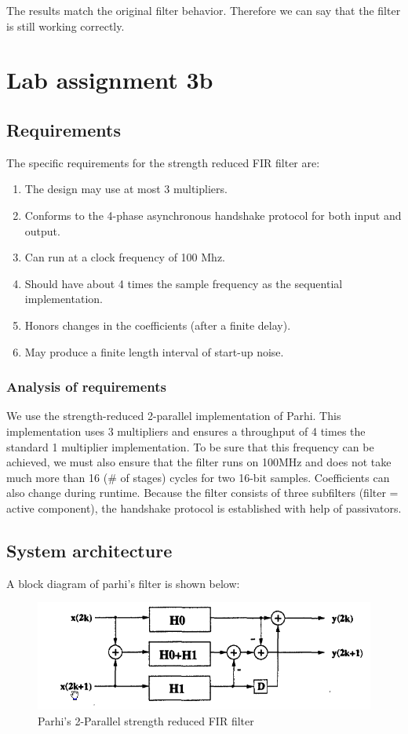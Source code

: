 \documentclass[a4paper,twoside,11pt, fleqn]{article}
\begin{document}
\newpage
The results match the original filter behavior. Therefore we can say that the filter is still working correctly.


\newpage
\section{Lab assignment 3b}
\subsection{Requirements}
\label{sec:req3b}
The specific requirements for the strength reduced FIR filter are:
\begin{enumerate}
\item The design may use at most 3 multipliers.
\item Conforms to the 4-phase asynchronous handshake protocol for both input and output.
\item Can run at a clock frequency of 100 Mhz.
\item Should have about 4 times the sample frequency as the sequential implementation.
\item Honors changes in the coefficients (after a finite delay).
\item May produce a finite length interval of start-up noise.
\end{enumerate}
\subsubsection{Analysis of requirements}
We use the strength-reduced 2-parallel implementation of Parhi. This implementation uses 3 multipliers and ensures a throughput of 4 times the standard 1 multiplier implementation. To be sure that this frequency can be achieved, we must also ensure that the filter runs on 100MHz and does not take much more than 16 (\# of stages) cycles for two 16-bit samples. Coefficients can also change during runtime. Because the filter consists of three subfilters (filter = active component), the handshake protocol is established with help of passivators.

\subsection{System architecture}
\label{sec:blk3b}
 A block diagram of parhi's filter is shown below:
 
\begin{figure}[h]
	
	\includegraphics[scale = 0.71]{Images/3b_parhi}
    \caption{Parhi's 2-Parallel strength reduced FIR filter}
    \label{fig:3bparhi}
\end{figure}
\end{document}

